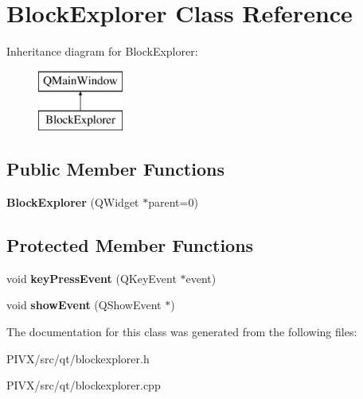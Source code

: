 \hypertarget{class_block_explorer}{}\section{Block\+Explorer Class Reference}
\label{class_block_explorer}
Inheritance diagram for Block\+Explorer\+:\begin{figure}[H]
\begin{center}
\leavevmode
\includegraphics[height=2.000000cm]{class_block_explorer}
\end{center}
\end{figure}
\subsection*{Public Member Functions}
\begin{DoxyCompactItemize}
\item 
\mbox{\label{class_block_explorer_aa1824a81f9b6d20dce7be419170ea02b}} 
{\bfseries Block\+Explorer} (Q\+Widget $\ast$parent=0)
\end{DoxyCompactItemize}
\subsection*{Protected Member Functions}
\begin{DoxyCompactItemize}
\item 
\mbox{\label{class_block_explorer_ae64a065d31adf1c1411dc1810cdd576c}} 
void {\bfseries key\+Press\+Event} (Q\+Key\+Event $\ast$event)
\item 
\mbox{\label{class_block_explorer_a2558e79dbb14bda3d9367f0b50240fa4}} 
void {\bfseries show\+Event} (Q\+Show\+Event $\ast$)
\end{DoxyCompactItemize}


The documentation for this class was generated from the following files\+:\begin{DoxyCompactItemize}
\item 
P\+I\+V\+X/src/qt/blockexplorer.\+h\item 
P\+I\+V\+X/src/qt/blockexplorer.\+cpp\end{DoxyCompactItemize}
